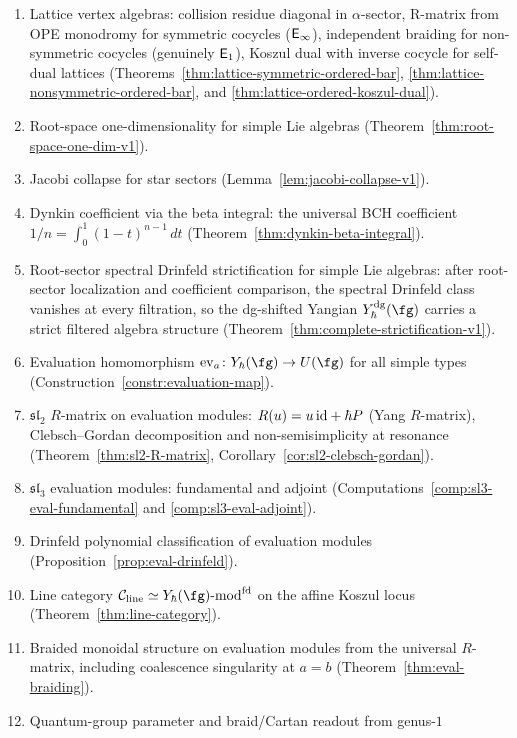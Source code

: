 \begin{enumerate}[label=(\arabic*)]
free-field Yangian reduction
(Theorem~\ref{thm:wakimoto-ordered-bar}).
\item Lattice vertex algebras: collision residue diagonal in
$\alpha$-sector, R-matrix from OPE monodromy for symmetric cocycles
($\mathsf{E}_{\infty}$), independent braiding for non-symmetric cocycles (genuinely
$\mathsf{E}_1$), Koszul dual with inverse cocycle for self-dual lattices
(Theorems~\ref{thm:lattice-symmetric-ordered-bar},
\ref{thm:lattice-nonsymmetric-ordered-bar},
and \ref{thm:lattice-ordered-koszul-dual}).
\item Root-space one-dimensionality for simple Lie algebras
(Theorem~\ref{thm:root-space-one-dim-v1}).
\item Jacobi collapse for star sectors
(Lemma~\ref{lem:jacobi-collapse-v1}).
\item Dynkin coefficient via the beta integral: the universal BCH
coefficient $1/n = \int_0^1(1-t)^{n-1}\,dt$
(Theorem~\ref{thm:dynkin-beta-integral}).
\item Root-sector spectral Drinfeld strictification for simple Lie
algebras: after root-sector localization and coefficient comparison,
the spectral Drinfeld class vanishes at every filtration, so the
dg-shifted Yangian $Y^{\mathrm{dg}}_\hbar(\fg)$ carries a strict
filtered algebra structure
(Theorem~\ref{thm:complete-strictification-v1}).
\item Evaluation homomorphism $\mathrm{ev}_a\colon Y_\hbar(\fg)\to U(\fg)$
for all simple types (Construction~\ref{constr:evaluation-map}).
\item $\mathfrak{sl}_2$ $R$-matrix on evaluation modules: $R(u)=u\,\mathrm{id}+\hbar P$
(Yang $R$-matrix), Clebsch--Gordan decomposition and non-semisimplicity
at resonance (Theorem~\ref{thm:sl2-R-matrix}, Corollary~\ref{cor:sl2-clebsch-gordan}).
\item $\mathfrak{sl}_3$ evaluation modules: fundamental and adjoint
(Computations~\ref{comp:sl3-eval-fundamental} and \ref{comp:sl3-eval-adjoint}).
\item Drinfeld polynomial classification of evaluation modules
(Proposition~\ref{prop:eval-drinfeld}).
\item Line category $\mathcal{C}_{\mathrm{line}}\simeq
Y_\hbar(\fg)\text{-}\mathrm{mod}^{\mathrm{fd}}$ on the affine Koszul locus
(Theorem~\ref{thm:line-category}).
\item Braided monoidal structure on evaluation modules from the universal
$R$-matrix, including coalescence singularity at $a=b$
(Theorem~\ref{thm:eval-braiding}).
\item Quantum-group parameter and braid/Cartan readout from genus-$1$

\end{enumerate}
